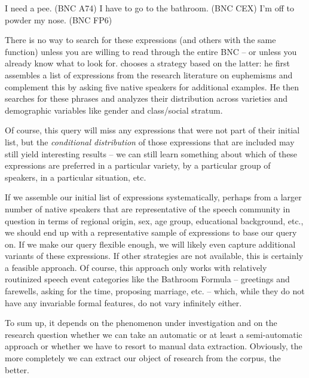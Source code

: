 \begin{exe}
\ex
\begin{xlist}
\label{ex:bathroomformula}
\ex I need a pee. (BNC A74)
\ex I have to go to the bathroom. (BNC CEX)
\ex I'm off to powder my nose. (BNC FP6)
\end{xlist}
\end{exe}

There is no way to search for these expressions (and others with the same function) unless you are willing to read through the entire BNC  -- or unless you already know what to look for. \citet{levin_bathroom_2014} chooses a strategy based on the latter: he first assembles a list of expressions from the research literature on euphemisms and complement this by asking five native speakers for additional examples. He then searches for these phrases and analyzes their distribution  across varieties  and demographic  variables like gender and class\slash social stratum.

Of course, this query  will miss any expressions that were not part of their initial list, but the \emph{conditional distribution}  of those expressions that are included may still yield interesting results -- we can still learn something about which of these expressions are preferred in a particular variety,  by a particular group of speakers, in a particular situation, etc.

If we assemble our initial list of expressions systematically, perhaps from a larger number of native speakers that are representative  of the speech community in question in terms of regional origin, sex, age  group, educational background, etc., we should end up with a representative sample  of expressions to base our query  on. If we make our query flexible enough, we will likely even capture  additional variants of these expressions. If other strategies are not available, this is certainly a feasible approach. Of course, this approach only works with relatively routinized speech event categories like the Bathroom Formula -- greetings and farewells, asking for the time, proposing marriage, etc. -- which, while they do not have any invariable formal features, do not vary infinitely either.

To sum up, it depends on the phenomenon under investigation and on the research question whether we can take an automatic or at least a semi\hyp{}automatic approach or whether we have to resort to manual  data extraction.  Obviously, the more completely we can extract our object of research from the corpus, the better.

